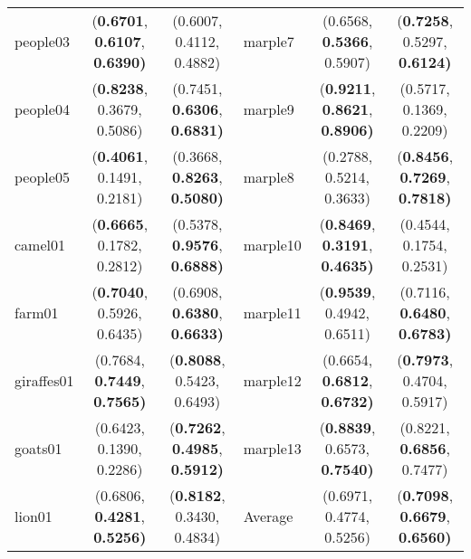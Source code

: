 \begin{table*}[!t]
\begin{tabular}{lcc|lcc}
    people03 &  (\textbf{0.6701}, \textbf{0.6107}, \textbf{0.6390)} &  (0.6007, 0.4112, 0.4882) &     marple7 &  (0.6568, \textbf{0.5366}, 0.5907) &  (\textbf{0.7258}, 0.5297, \textbf{0.6124)} \\
    people04 &  (\textbf{0.8238}, 0.3679, 0.5086) &  (0.7451, \textbf{0.6306}, \textbf{0.6831)} &     marple9 &  (\textbf{0.9211}, \textbf{0.8621}, \textbf{0.8906)} &  (0.5717, 0.1369, 0.2209) \\
    people05 &  (\textbf{0.4061}, 0.1491, 0.2181) &  (0.3668, \textbf{0.8263}, \textbf{0.5080)} &     marple8 &  (0.2788, 0.5214, 0.3633) &  (\textbf{0.8456}, \textbf{0.7269}, \textbf{0.7818)} \\
     camel01 &  (\textbf{0.6665}, 0.1782, 0.2812) &  (0.5378, \textbf{0.9576}, \textbf{0.6888)} &    marple10 &  (\textbf{0.8469}, \textbf{0.3191}, \textbf{0.4635)} &  (0.4544, 0.1754, 0.2531) \\
      farm01 &  (\textbf{0.7040}, 0.5926, 0.6435) &  (0.6908, \textbf{0.6380}, \textbf{0.6633)} &    marple11 &  (\textbf{0.9539}, 0.4942, 0.6511) &  (0.7116, \textbf{0.6480}, \textbf{0.6783)} \\
  giraffes01 &  (0.7684, \textbf{0.7449}, \textbf{0.7565)} &  (\textbf{0.8088}, 0.5423, 0.6493) &    marple12 &  (0.6654, \textbf{0.6812}, \textbf{0.6732)} &  (\textbf{0.7973}, 0.4704, 0.5917) \\
     goats01 &  (0.6423, 0.1390, 0.2286) &  (\textbf{0.7262}, \textbf{0.4985}, \textbf{0.5912)} &    marple13 &  (\textbf{0.8839}, 0.6573, \textbf{0.7540)} &  (0.8221, \textbf{0.6856}, 0.7477) \\
      lion01 &  (0.6806, \textbf{0.4281}, \textbf{0.5256)} &  (\textbf{0.8182}, 0.3430, 0.4834) &    Average  &  (0.6971, 0.4774, 0.5256) &  (\textbf{0.7098}, \textbf{0.6679}, \textbf{0.6560)} \\

 \hline
\end{tabular}
\end{table*}

